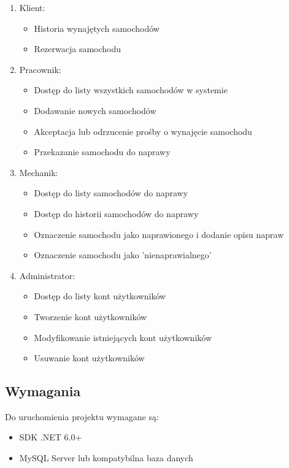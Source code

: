 \documentclass{article}
\begin{document}
\begin{enumerate}
    \item Klient:
    \begin{itemize}
        \item Historia wynajętych samochodów
        \item Rezerwacja samochodu
    \end{itemize}
    \item Pracownik:
    \begin{itemize}
        \item Dostęp do listy wszystkich samochodów w systemie
        \item Dodawanie nowych samochodów
        \item Akceptacja lub odrzucenie prośby o wynajęcie samochodu
        \item Przekazanie samochodu do naprawy
    \end{itemize}
    \item Mechanik:
    \begin{itemize}
        \item Dostęp do listy samochodów do naprawy
        \item Dostęp do historii samochodów do naprawy
        \item Oznaczenie samochodu jako naprawionego i dodanie opisu napraw
        \item Oznaczenie samochodu jako 'nienaprawialnego'
    \end{itemize}
    \item Administrator:
    \begin{itemize}
        \item Dostęp do listy kont użytkowników
        \item Tworzenie kont użytkowników
        \item Modyfikowanie istniejących kont użytkowników
        \item Usuwanie kont użytkowników
    \end{itemize}
\end{enumerate}

\subsection{Wymagania}

Do uruchomienia projektu wymagane są:
\begin{itemize}
    \item SDK .NET 6.0+
    \item MySQL Server lub kompatybilna baza danych
\end{itemize}
\vspace{1em}
\end{document}
